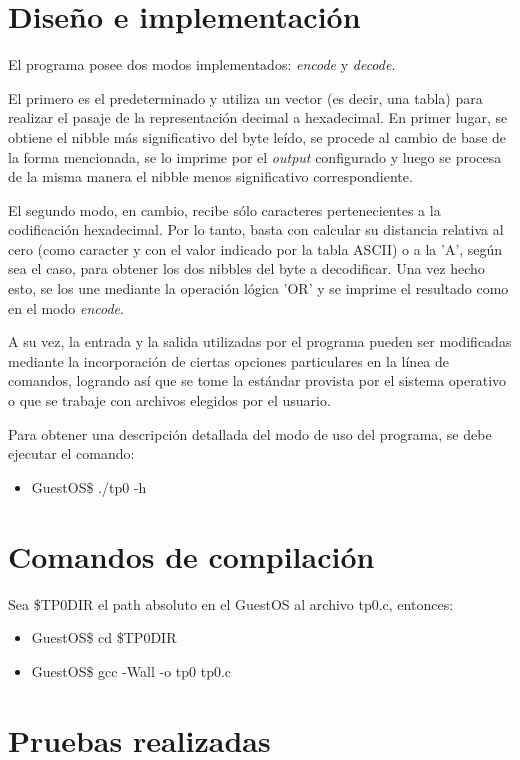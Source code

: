 \documentclass{article}
\begin{document}
\section{Diseño e implementación}
El programa posee dos modos implementados: \textit{encode} y \textit{decode}.\par
El primero es el predeterminado y utiliza un vector (es decir, una tabla) para realizar el pasaje de la representaci\'on decimal a hexadecimal. En primer lugar, se obtiene el nibble más significativo del byte le\'ido, se procede al cambio de base de la forma mencionada, se lo imprime por el \textit{output} configurado y luego se procesa de la misma manera el nibble menos significativo correspondiente.\par
El segundo modo, en cambio, recibe s\'olo caracteres pertenecientes a la codificaci\'on hexadecimal. Por lo tanto, basta con calcular su distancia relativa al cero (como caracter y con el valor indicado por la tabla ASCII) o a la 'A', seg\'un sea el caso, para obtener los dos nibbles del byte a decodificar. Una vez hecho esto, se los une mediante la operaci\'on l\'ogica 'OR' y se imprime el resultado como en el modo \textit{encode}.\par
A su vez, la entrada y la salida utilizadas por el programa pueden ser modificadas mediante la incorporaci\'on de ciertas opciones particulares en la l\'inea de comandos, logrando as\'i que se tome la est\'andar provista por el sistema operativo o que se trabaje con archivos elegidos por el usuario.\par
Para obtener una descripci\'on detallada del modo de uso del programa, se debe ejecutar el comando:
\begin{itemize}
\item GuestOS\$ ./tp0 -h
\end{itemize}

\section{Comandos de compilación}
Sea \$TP0DIR el path absoluto en el GuestOS al archivo tp0.c, entonces:
\begin{itemize}
\item GuestOS\$ cd \$TP0DIR
\item GuestOS\$ gcc -Wall -o tp0 tp0.c
\end{itemize}

\section{Pruebas realizadas}
\end{document}
